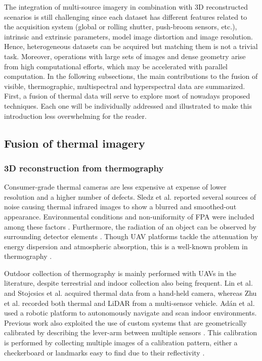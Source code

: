 The integration of multi-source imagery in combination with 3D reconstructed scenarios is still challenging since each dataset has different features related to the acquisition system (global or rolling shutter, push-broom sensors, etc.), intrinsic and extrinsic parameters, model image distortion and image resolution. Hence, heterogeneous datasets can be acquired but matching them is not a trivial task. Moreover, operations with large sets of images and dense geometry arise from high computational efforts, which may be accelerated with parallel computation. In the following subsections, the main contributions to the fusion of visible, thermographic, multispectral and hyperspectral data are summarized. First, a fusion of thermal data will serve to explore most of nowadays proposed techniques. Each one will be individually addressed and illustrated to make this introduction less overwhelming for the reader.

\subsection{Fusion of thermal imagery}

\subsubsection{3D reconstruction from thermography}

Consumer-grade thermal cameras are less expensive at expense of lower resolution and a higher number of defects. Sledz et al. \cite{sledz_thermal_2018} reported several sources of noise causing thermal infrared images to show a blurred and smoothed-out appearance. Environmental conditions and non-uniformity of FPA were included among these factors \cite{javadnejad_photogrammetric_2020}. Furthermore, the radiation of an object can be observed by surrounding detector elements \cite{vollmer_infrared_2017}. Though UAV platforms tackle the attenuation by energy dispersion and atmospheric absorption, this is a well-known problem in thermography \cite{gonzalez_thermal_2019, vollmer_infrared_2017, quattrochi_thermal_1999}.

Outdoor collection of thermography is mainly performed with UAVs in the literature, despite terrestrial and indoor collection also being frequent. Lin et al. \cite{lin_fusion_2019} and Stojcsics et al. \cite{stojcsics_high_2018} acquired thermal data from a hand-held camera, whereas Zhu et al. \cite{zhu_fusion_2021} recorded both thermal and LiDAR from a multi-sensor vehicle. Adán et al. \cite{adan_towards_2020} used a robotic platform to autonomously navigate and scan indoor environments. Previous work also exploited the use of custom systems that are geometrically calibrated by describing the lever-arm between multiple sensors \cite{javadnejad_photogrammetric_2020, hoegner_fusion_2018}. This calibration is performed by collecting multiple images of a calibration pattern, either a checkerboard \cite{javadnejad_photogrammetric_2020} or landmarks easy to find due to their reflectivity \cite{adan_fusion_2017}. 

